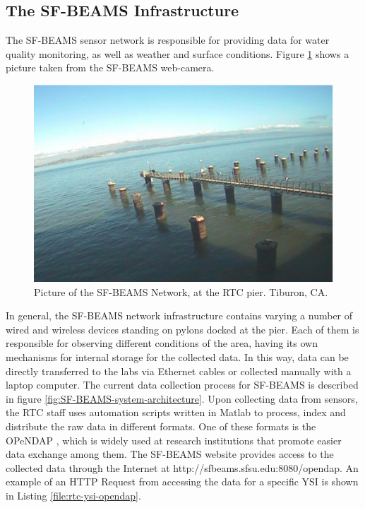 \subsection{The SF-BEAMS Infrastructure}
\label{sec:sfbeams}

The SF-BEAMS sensor network is responsible for providing data for water quality
monitoring, as well as weather and surface conditions. Figure
\ref{fig:sf-beams} shows a picture taken from the SF-BEAMS web-camera.

\begin{figure}[!t]
  \centering
    \includegraphics[scale=0.7]{../diagrams/cam_image-oct15}
  \caption{Picture of the SF-BEAMS Network, at the RTC pier. Tiburon, CA.}
  \label{fig:sf-beams}
\end{figure}

In general, the SF-BEAMS network infrastructure contains varying a number of
wired and wireless devices standing on pylons docked at the pier. Each of them
is responsible for observing different conditions of the area, having its own
mechanisms for internal storage for the collected data. In this way, data can
be directly transferred to the labs via Ethernet cables or collected manually
with a laptop computer. The current data collection process for SF-BEAMS is
described in figure
\ref{fig:SF-BEAMS-system-architecture}\cite{sfbeams-current-system}. Upon
collecting data from sensors, the RTC staff uses automation scripts written in
Matlab \cite{matlab} to process, index and distribute the raw data in
different formats. One of these formats is the OPeNDAP \cite{opendap}, which
is widely used at research institutions that promote easier data exchange
among them. The SF-BEAMS website provides access to the collected data through
the Internet at http://sfbeams.sfsu.edu:8080/opendap. An example of an HTTP
Request from accessing the data for a specific YSI is shown in Listing
\ref{file:rtc-ysi-opendap}.

